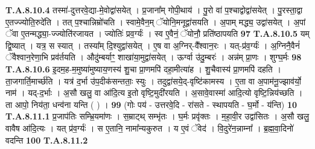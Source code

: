 \documentclass[17pt]{extarticle}
\begin{document}
                  \newline
                                                                  \textbf{ T.A.8.10.4} \newline
                  तस्मा॑-दुत्तरवे॒द्या-मे॒वोद्वा॑सयेत् । प्र॒जाना᳚म् गोपी॒थाय॑ । पु॒रो वा॑ प॒श्चाद्वोद्वा॑सयेत् । पु॒रस्ता॒द्वा ए॒तज्ज्योति॒रुदे॑ति । तत् प॒श्चान्निम्रो॑चति । स्वामे॒वैन॒म् ॅयोनि॒मनूद्वा॑सयति ।  अ॒पाम् मद्ध्य॒ उद्वा॑सयेत् । अ॒पां ॅवा ए॒तन्मद्ध्या॒-ज्ज्योति॑रजायत । ज्योतिः॑ प्रव॒र्ग्यः॑ । स्व ए॒॒वैनं॒ ॅयोनौ॒ प्रति॑ष्ठापयति \textbf{ 97} \newline
                  \newline
                                                                  \textbf{ T.A.8.10.5} \newline
                  यम् द्वि॒ष्यात् । यत्र॒ स स्यात् । तस्या᳚म् दि॒श्युद्वा॑सयेत् ।  ए॒ष वा अ॒ग्निर्-वै᳚श्वान॒रः । यत्-प्र॑व॒र्ग्यः॑ ।  अ॒ग्निनै॒वैनं॑ ॅवैश्वान॒रेणा॒भि प्रव॑र्तयति ।  औदु॑म्बर्याꣳ॒॒ शाखा॑या॒मुद्वा॑सयेत् ।  ऊर्ग्वा उ॑दु॒म्बरः॑ । अन्न॑म् प्रा॒णः । शुग्घ॒र्मः \textbf{ 98} \newline
                  \newline
                                                                  \textbf{ T.A.8.10.6} \newline
                  इ॒दम॒ह-म॒मुष्या॑मुष्याय॒णस्य॑ शु॒चा प्रा॒णमपि॑ दहा॒मीत्या॑ह । शु॒चैवास्य॑ प्रा॒णमपि॑ दहति । ता॒जगार्ति॒मार्च्छ॑ति । यत्र॑ द॒र्भा उ॑प॒दीक॑सन्तताः॒ स्युः । तदुद्वा॑सये॒द्-वृष्टि॑कामस्य । ए॒ता वा अ॒पाम॑नू॒ज्झाव॑र्यो॒ नाम॑ ।  यद्-द॒र्भाः । अ॒सौ खलु॒ वा आ॑दि॒त्य इ॒तो वृष्टि॒मुदी॑रयति । अ॒सावे॒वास्मा॑ आदि॒त्यो वृष्टि॒न्निय॑च्छति । ता आपो॒ निय॑ता॒ धन्व॑ना यन्ति ( ) । \textbf{ 99} \newline
                  \newline
                                                        (गोः पय॑ - उत्तरवे॒दि - रा॑सते - स्थापयति - घ॒र्मो - य॑न्ति) \textbf{10} \newline \newline
                                \textbf{ T.A.8.11.1} \newline
                  प्र॒जाप॑तिः सम्भ्रि॒यमा॑णः । स॒म्राट्थ् सम्भृ॑तः । घ॒र्मः प्रवृ॑क्तः । म॒हा॒वी॒र उद्वा॑सितः । अ॒सौ खलु॒ वावैष आ॑दि॒त्यः । यत् प्र॑व॒र्ग्यः॑ ।  स ए॒तानि॒ नामा᳚न्यकुरुत । य ए॒वं ॅवेद॑ । वि॒दुरे॑न॒न्नाम्ना᳚ । ब्र॒ह्म॒वा॒दिनो॑ वदन्ति \textbf{ 100} \newline
                  \newline
                                                                  \textbf{ T.A.8.11.2} \newline
\end{document}

